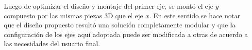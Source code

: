 Luego de optimizar el diseño y montaje del primer eje, se montó el eje $\textit{y}$ compuesto por las mismas piezas 3D que el eje $\textit{x}$. En este sentido se hace notar que el diseño propuesto resultó una solución completamente modular y que la configuración de los ejes aquí adoptada puede ser modificada a otras de acuerdo a las necesidades del usuario final. 
 
\begin{figure}[H]
	\begin{floatrow}

\end{floatrow}
\end{figure}
